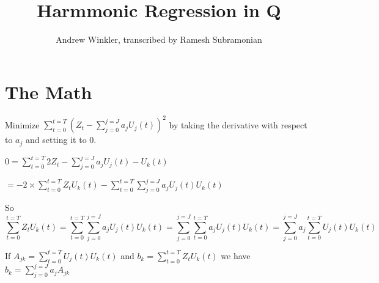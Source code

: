 \documentclass[12pt,timesnewroman,letterpaper]{article}
\begin{document}
\title{Harmmonic Regression in Q}
\author{Andrew Winkler, transcribed by Ramesh Subramonian }
\maketitle
\thispagestyle{fancy}
\cfoot{}
\rfoot{{\small \thepage}}

\section{The Math}
Minimize \(\sum_{t=0}^{t=T} (Z_t - \sum_{j=0}^{j=J} a_j U_j(t))^2\)
by taking the derivative with respect to \(a_j\) and setting it to 0.

\(0 = \sum_{t=0}^{t=T} 2 Z_t - \sum_{j=0}^{j=J} a_j U_j(t) - U_k(t)\)

\(= -2 \times  \sum_{t=0}^{t=T}  Z_t U_k(t) - 
\sum_{t=0}^{t=T}  \sum_{j=0}^{j=J} a_j U_j(t) U_k(t) \)

So  
\begin{displaymath}
  \sum_{t=0}^{t=T}  Z_t U_k(t) =  \sum_{t=0}^{t=T}  \sum_{j=0}^{j=J} a_j
U_j(t) U_k(t) =  \sum_{j=0}^{j=J}  \sum_{t=0}^{t=T} a_j U_j(t) U_k(t)
= \sum_{j=0}^{j=J}  a_j  \sum_{t=0}^{t=T} U_j(t) U_k(t)
\end{displaymath}

If \(A_{jk} =  \sum_{t=0}^{t=T} U_j(t) U_k(t)\) and 
\(b_k =  \sum_{t=0}^{t=T}  Z_t U_k(t)\) we have 
\(b_k = \sum_{j=0}^{j=J} a_j A_{jk}\)


\TBC
\end{document}
